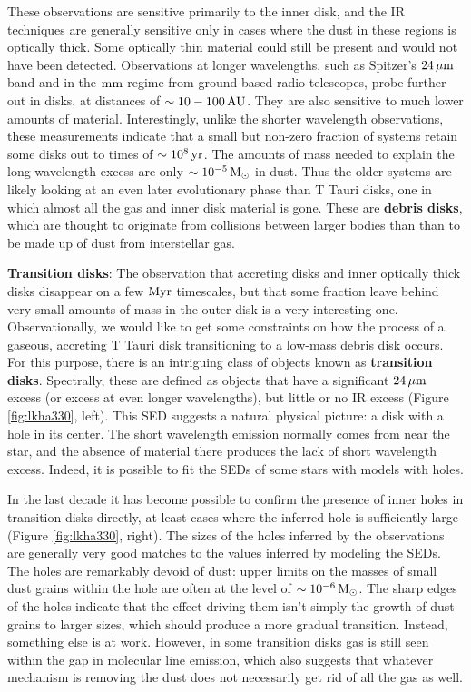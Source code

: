 \documentclass[a4paper,10pt]{article}
\begin{document}
{\noindent}These observations are sensitive primarily to the inner disk, and the IR techniques are generally sensitive only in cases where the dust in these regions is optically thick. Some optically thin material could still be present and would not have been detected. Observations at longer wavelengths, such as Spitzer's $24\,\mu{\rm m}$ band and in the ${\rm mm}$ regime from ground-based radio telescopes, probe further out in disks, at distances of $\sim10-100\,{\rm AU}$. They are also sensitive to much lower amounts of material. Interestingly, unlike the shorter wavelength observations, these measurements indicate that a small but non-zero fraction of systems retain some disks out to times of $\sim10^8\,{\rm yr}$. The amounts of mass needed to explain the long wavelength excess are only $\sim10^{-5}\,{\rm M_\odot}$ in dust. Thus the older systems are likely looking at an even later evolutionary phase than T Tauri disks, one in which almost all the gas and inner disk material is gone. These are \textbf{debris disks}, which are thought to originate from collisions between larger bodies than than to be made up of dust from interstellar gas.

{\noindent}\textbf{Transition disks}: The observation that accreting disks and inner optically thick disks disappear on a few ${\rm Myr}$ timescales, but that some fraction leave behind very small amounts of mass in the outer disk is a very interesting one. Observationally, we would like to get some constraints on how the process of a gaseous, accreting T Tauri disk transitioning to a low-mass debris disk occurs. For this purpose, there is an intriguing class of objects known as \textbf{transition disks}. Spectrally, these are defined as objects that have a significant $24\,\mu{\rm m}$ excess (or excess at even longer wavelengths), but little or no IR excess (Figure \ref{fig:lkha330}, left). This SED suggests a natural physical picture: a disk with a hole in its center. The short wavelength emission normally comes from near the star, and the absence of material there produces the lack of short wavelength excess. Indeed, it is possible to fit the SEDs of some stars with models with holes.

{\noindent}In the last decade it has become possible to confirm the presence of inner holes in transition disks directly, at least cases where the inferred hole is sufficiently large (Figure \ref{fig:lkha330}, right). The sizes of the holes inferred by the observations are generally very good matches to the values inferred by modeling the SEDs. The holes are remarkably devoid of dust: upper limits on the masses of small dust grains within the hole are often at the level of $\sim10^{-6}\,{\rm M_\odot}$. The sharp edges of the holes indicate that the effect driving them isn't simply the growth of dust grains to larger sizes, which should produce a more gradual transition. Instead, something else is at work. However, in some transition disks gas is still seen within the gap in molecular line emission, which also suggests that whatever mechanism is removing the dust does not necessarily get rid of all the gas as well.
\end{document}
